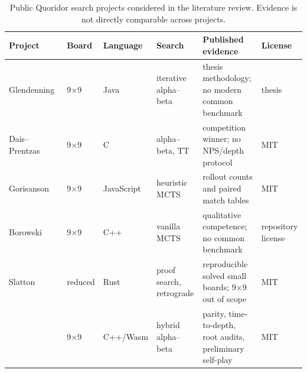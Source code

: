 \begin{table}[t]
\centering
\caption{Public Quoridor search projects considered in the literature review. Evidence is not directly comparable across projects.}
\label{tab:related-work}
\scriptsize
\begin{tabular}{p{}p{}p{}p{}p{}p{}}
\toprule
Project & Board & Language & Search & Published evidence & License \\
\midrule
Glendenning~\cite{glendenning2005} & 9$\times$9 & Java & iterative alpha--beta & thesis methodology; no modern common benchmark & thesis \\
Dais--Prentzas~\cite{dais2023} & 9$\times$9 & C & alpha--beta, TT & competition winner; no NPS/depth protocol & MIT \\
Gorisanson~\cite{gorisanson2024} & 9$\times$9 & JavaScript & heuristic MCTS & rollout counts and paired match tables & MIT \\
Borowski~\cite{borowski2021} & 9$\times$9 & C++ & vanilla MCTS & qualitative competence; no common benchmark & repository license \\
Slatton~\cite{slatton2026solver} & reduced & Rust & proof search, retrograde & reproducible solved small boards; 9$\times$9 out of scope & MIT \\
\walwuk{} & 9$\times$9 & C++/Wasm & hybrid alpha--beta & parity, time-to-depth, root audits, preliminary self-play & MIT \\
\bottomrule
\end{tabular}
\end{table}
